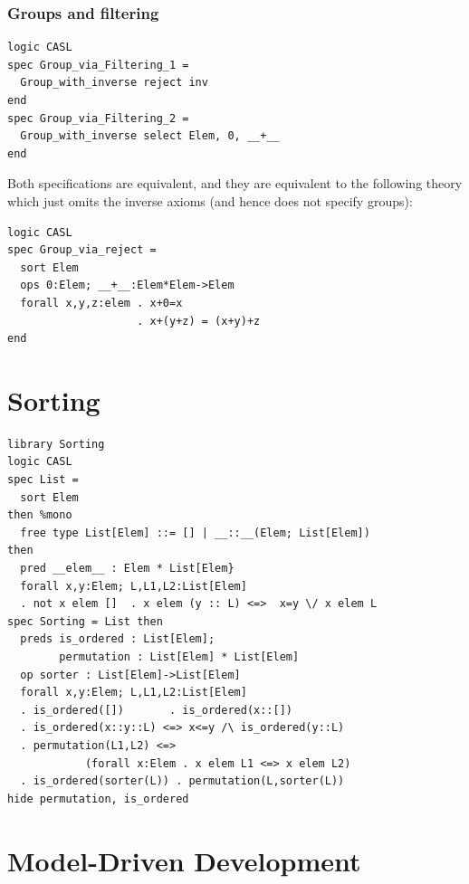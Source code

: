\documentclass[10pt,fleqn,%
\ifpretendfinal
final%
\else
draft%
\fi,
]{scrreprt}
\newcommand{\sclause}[1]{\section{#1}}
\newcommand{\sssclause}[1]{\subsubsection{#1}}
\begin{document}
\sssclause{Groups and filtering}
\begin{lstlisting}[basicstyle=\ttfamily,language=dolText,morekeywords={props,ObjectProperty,Class,DisjointUnionOf,SubClassOf,Characteristics,Transitive,Asymmetric,SubPropertyOf,DisjointClasses,EquivalentTo,inverse,only,forall,iff,if,or,exists,sort,ops,spec,forget},escapechar=@,mathescape]
logic CASL
spec Group_via_Filtering_1 =
  Group_with_inverse reject inv
end
spec Group_via_Filtering_2 =
  Group_with_inverse select Elem, 0, __+__
end
\end{lstlisting}
Both specifications are equivalent, and they are equivalent 
to the following theory which just omits the inverse
axioms (and hence does not specify groups):
\begin{lstlisting}[basicstyle=\ttfamily,language=dolText,morekeywords={props,ObjectProperty,Class,DisjointUnionOf,SubClassOf,Characteristics,Transitive,Asymmetric,SubPropertyOf,DisjointClasses,EquivalentTo,inverse,only,forall,iff,if,or,exists,sort,ops,spec,forget},escapechar=@,mathescape]
logic CASL
spec Group_via_reject =
  sort Elem
  ops 0:Elem; __+__:Elem*Elem->Elem
  forall x,y,z:elem . x+0=x
                    . x+(y+z) = (x+y)+z
end
\end{lstlisting}

\sclause{Sorting}

\begin{lstlisting}[basicstyle=\ttfamily,language=dolText,morekeywords={props,ObjectProperty,Class,DisjointUnionOf,SubClassOf,Characteristics,Transitive,Asymmetric,SubPropertyOf,DisjointClasses,EquivalentTo,inverse,only,forall,iff,if,or,exists,spec,free,type,op,ops,spec,pred,preds},escapechar=@,mathescape]
library Sorting
logic CASL
spec List =  
  sort Elem
then %mono
  free type List[Elem] ::= [] | __::__(Elem; List[Elem])
then
  pred __elem__ : Elem * List[Elem}
  forall x,y:Elem; L,L1,L2:List[Elem]
  . not x elem []  . x elem (y :: L) <=>  x=y \/ x elem L
spec Sorting = List then
  preds is_ordered : List[Elem];
        permutation : List[Elem] * List[Elem]
  op sorter : List[Elem]->List[Elem]
  forall x,y:Elem; L,L1,L2:List[Elem]
  . is_ordered([])       . is_ordered(x::[])
  . is_ordered(x::y::L) <=> x<=y /\ is_ordered(y::L)
  . permutation(L1,L2) <=> 
            (forall x:Elem . x elem L1 <=> x elem L2)
  . is_ordered(sorter(L)) . permutation(L,sorter(L))
hide permutation, is_ordered
\end{lstlisting}



\sclause{Model-Driven Development}
\end{document}
